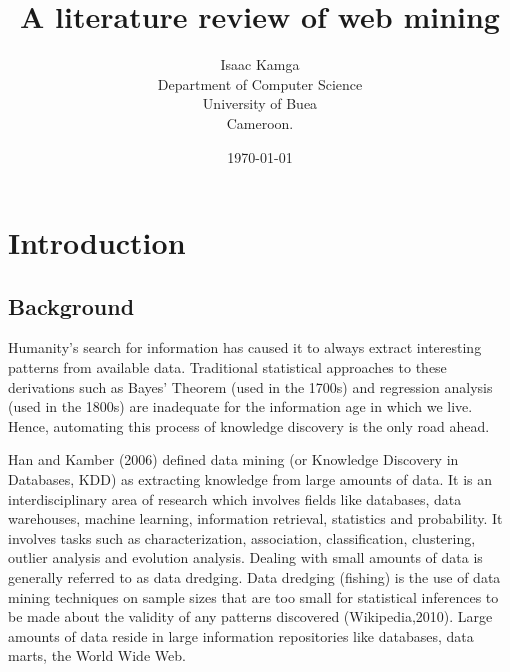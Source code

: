 \documentclass{article}
\title{A literature review of web mining}
\author{Isaac Kamga\\
Department of Computer Science\\
University of Buea\\
Cameroon.\\ }
\date{\today}
\begin{document}
\maketitle
{}

\pagebreak
\tableofcontents{}

\pagebreak
\section{Introduction}
\subsection{Background}

Humanity’s search for information has caused it to always extract interesting patterns from available data. Traditional statistical approaches to these derivations such as Bayes’ Theorem (used in the 1700s) and regression analysis (used in the 1800s) are inadequate for the information age in which we live. Hence, automating this process of knowledge discovery is the only road ahead.

Han and Kamber (2006) defined data mining (or Knowledge Discovery in Databases, KDD) as extracting knowledge from large amounts of data. It is an interdisciplinary area of research which involves fields like databases, data warehouses, machine learning, information retrieval, statistics and probability. It involves tasks such as characterization, association, classification, clustering, outlier analysis and evolution analysis. Dealing with small amounts of data is generally referred to as data dredging. Data dredging (fishing) is the use of data mining techniques on sample sizes that are too small for statistical inferences to be made about the validity of any patterns discovered (Wikipedia,2010). Large amounts of data reside in large information repositories like databases, data marts, the World Wide Web.
\end{document}
